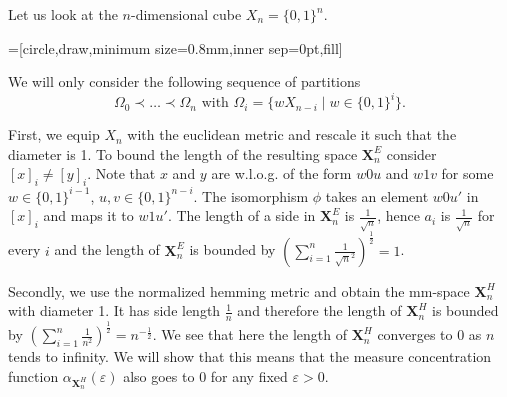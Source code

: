 \begin{example}
Let us look at the $n$-dimensional cube $X_n=\{0,1\}^n$.

\begin{center}
=[circle,draw,minimum size=0.8mm,inner sep=0pt,fill]
\end{center}
We will only consider the following sequence of partitions
\[\Omega_0\prec\dots\prec\Omega_n\text{ with }\Omega_i=\{wX_{n-i}\mid w\in\{0,1\}^i\}.\]

First, we equip $X_n$ with the euclidean metric and rescale it such that the diameter is 1. To bound the length of the resulting space $\boldsymbol X^E_n$ consider $[x]_i\neq[y]_i$. Note that $x$ and $y$ are w.l.o.g. of the form $w0u$ and $w1v$ for some $w\in\{0,1\}^{i-1}$, $u,v\in\{0,1\}^{n-i}$. The isomorphism $\phi$ takes an element $w0u'$ in $[x]_i$ and maps it to $w1u'$. The length of a side in $\boldsymbol X^E_n$ is $\frac{1}{\sqrt{n}}$, hence $a_i$ is $\frac{1}{\sqrt{n}}$ for every $i$ and the length of $\boldsymbol{X}^E_n$ is bounded by $(\sum_{i=1}^{n}\frac{1}{\sqrt{n}^2})^{\frac{1}{2}}=1$.

Secondly, we use the normalized hemming metric and obtain the mm-space $\boldsymbol{X}^H_n$ with diameter 1. It has side length $\frac{1}{n}$ and therefore the length of $\boldsymbol{X}^H_n$ is bounded by $(\sum_{i=1}^{n}\frac{1}{n^2})^{\frac{1}{2}}=n^{-\frac{1}{2}}$. We see that here the length of $\boldsymbol{X}^H_n$ converges to 0 as $n$ tends to infinity. We will show that this means that the measure concentration function $\alpha_{\boldsymbol{X}^H_n}(\varepsilon)$ also goes to 0 for any fixed $\varepsilon>0$. 
\end{example}

